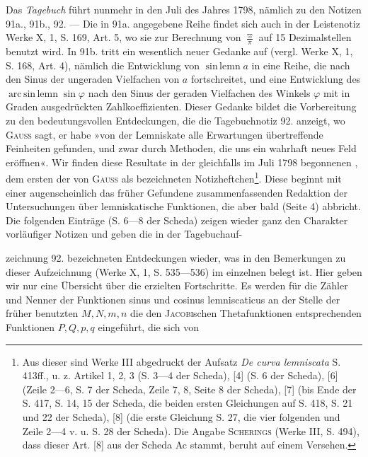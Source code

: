 \bigskip
Das \textit{Tagebuch} führt nunmehr in den Juli des Jahres 1798, nämlich zu
den Notizen 91a., 91b., 92. — Die in 91a. angegebene Reihe findet sich
auch in der Leistenotiz Werke X, 1, S. 169, Art. 5, wo sie zur Berechnung
von \(\frac{\varpi}{\pi}\) auf 15 Dezimalstellen benutzt wird. In 91b. tritt ein wesentlich neuer
Gedanke auf (vergl. Werke X, 1, S. 168, Art. 4), nämlich die Entwicklung von
\(\operatorname{sin\,lemn}a\) in eine Reihe, die nach den Sinus der ungeraden Vielfachen von \(a\)
fortschreitet, und eine Entwicklung des \(\operatorname{arc\,sin\,lemn}\sin\varphi\) nach den Sinus der
geraden Vielfachen des Winkels \(\varphi\) mit in Graden ausgedrückten Zahlkoeffizienten.
Dieser Gedanke bildet die Vorbereitung zu den bedeutungsvollen
Entdeckungen, die die Tagebuchnotiz 92. anzeigt, wo \textsc{Gauss} sagt, er habe
»von der Lemniskate alle Erwartungen übertreffende Feinheiten gefunden, und
zwar durch Methoden, die uns ein wahrhaft neues Feld eröffnen«. Wir finden
diese Resultate in der gleichfalls im Juli 1798 begonnenen , dem
ersten der von \textsc{Gauss} als  bezeichneten Notizheftchen\footnote{Aus dieser sind Werke III abgedruckt der Aufsatz \textit{De curva lemniscata} S. 413ff., u. z. Artikel 1,
2, 3 (S. 3—4 der Scheda), [4] (S. 6 der Scheda), [6] (Zeile 2—6, S. 7 der Scheda, Zeile 7, 8, Seite 8 der
Scheda), [7] (bis Ende der S. 417, S. 14, 15 der Scheda, die beiden ersten Gleichungen auf S. 418, S. 21
und 22 der Scheda), [8] (die erste Gleichung S. 27, die vier folgenden und Zeile 2—4 v. u. S. 28 der Scheda).
Die Angabe \textsc{Scherings} (Werke III, S. 494), dass dieser Art. [8] aus der Scheda Ac stammt, beruht auf
einem Versehen.}. Diese beginnt
mit einer augenscheinlich das früher Gefundene zusammenfassenden Redaktion
der Untersuchungen über lemniskatische Funktionen, die aber bald
(Seite 4) abbricht. Die folgenden Einträge (S. 6—8 der Scheda) zeigen wieder
ganz den Charakter vorläufiger Notizen und geben die in der Tagebuchauf-\par
\clearpage{}
\noindent zeichnung 92. bezeichneten Entdeckungen wieder, was in den Bemerkungen
zu dieser Aufzeichnung (Werke X, 1, S. 535—536) im einzelnen belegt ist.
Hier geben wir nur eine Übersicht über die erzielten Fortschritte. Es werden
für die Zähler und Nenner der Funktionen sinus und cosinus lemniscaticus
an der Stelle der früher benutzten \(M,N,m,n\) die den \textsc{Jacobi}schen Thetafunktionen
entsprechenden Funktionen \(P,Q,p,q\) eingeführt, die sich von
